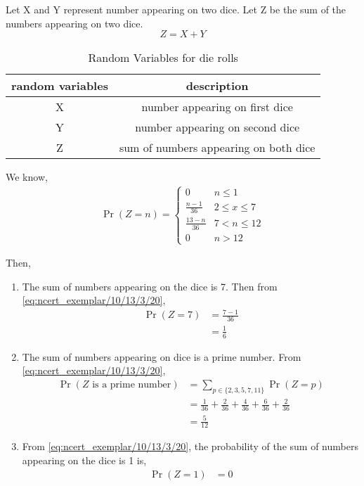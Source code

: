 \documentclass[]{article}
\begin{document}
\let\vec\mathbf
\fi
 Let X and Y represent number appearing on two dice. Let Z be the sum of the numbers appearing on two dice.
$$Z=X+Y$$

\begin{table}[H]
\centering
\begin{tabular}{|c|c|}
\hline
random variables & description \\
\hline
X & number appearing on first dice \\
\hline
Y & number appearing on second dice \\
\hline
Z & sum of numbers appearing on both dice \\
\hline
\end{tabular}
\label{tab:ncert_exemplar/10/13/3/20}
\caption{Random Variables for die rolls}
\end{table}

 We know,
\begin{align}
\Pr(Z=n) = 
\begin{cases}
0 &  n \leq{1} \\
\frac{n-1}{36} &  2 \leq{x} \leq{7} \\
\frac{13-n}{36} &  7 < n \leq{12} \\
0 &  n>12
\label{eq:ncert_exemplar/10/13/3/20}
\end{cases}
\end{align}

Then,
\begin{enumerate}
\item{The sum of numbers appearing on the dice is 7. Then from \eqref{eq:ncert_exemplar/10/13/3/20},
\begin{align}
\Pr(Z=7) &= \frac{7-1}{36} \\
&= \frac{1}{6}
\end{align}
}
\item{ The sum of numbers appearing on dice is a prime number. From \eqref{eq:ncert_exemplar/10/13/3/20},
\begin{align}
\Pr(Z \text{ is a prime number}) &= \sum_{p \in \{2, 3, 5, 7, 11\}} \Pr(Z = p) \\
&= \frac{1}{36} + \frac{2}{36} + \frac{4}{36} + \frac{6}{36} + \frac{2}{36} \\
&= \frac{5}{12}
\end{align}
}
\item{ From \eqref{eq:ncert_exemplar/10/13/3/20}, the probability of the sum of numbers appearing on the dice is 1 is, 
\begin{align}
\Pr(Z=1) &= 0
\end{align}
}
\end{enumerate}
\end{document}
